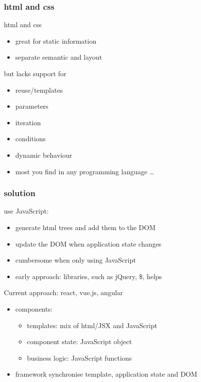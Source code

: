\begin{frame}[fragile] \frametitle{html and css}
html and css
\begin{itemize}
  \item great for static information
  \item separate semantic and layout
\end{itemize}
but lacks support for
\begin{itemize}
  \item reuse/templates
  \item parameters
  \item iteration
  \item conditions
  \item dynamic behaviour
  \item most you find in any programming language \ldots
\end{itemize}
\end{frame}

\begin{frame}[fragile] \frametitle{solution}
use JavaScript:
\begin{itemize}
  \item generate html trees and add them to the DOM
  \item update the DOM when application state changes
  \item cumbersome when only using JavaScript
  \item early approach: libraries, such as jQuery, \$, helps
\end{itemize}
\vspace{4mm}
Current approach: react, vue.js, angular
\begin{itemize}
  \item components:
  \begin{itemize}
    \item templates: mix of html/JSX and JavaScript
    \item component state: JavaScript object
    \item business logic: JavaScript functions
  \end{itemize}
  \item framework synchronise template, application state and DOM
\end{itemize}
\end{frame}

